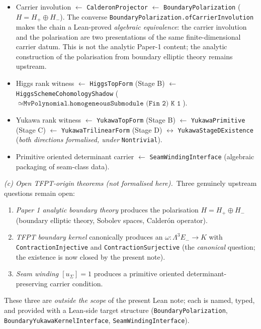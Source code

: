 \documentclass[11pt,a4paper]{article}
\begin{document}
\begin{tfptclaimcontract}
\begin{itemize}[leftmargin=1.6em, itemsep=0pt]
  \item Carrier involution $\leftarrow$
    \texttt{CalderonProjector} $\leftarrow$
    \texttt{BoundaryPolarization} ($H = H_+ \oplus H_-$).
    The converse \texttt{BoundaryPolarization.ofCarrierInvolution}
    makes the chain a Lean-proved \emph{algebraic
    equivalence}: the carrier involution and the polarisation
    are two presentations of the same finite-dimensional
    carrier datum. This is not the analytic Paper-1 content;
    the analytic construction of the polarisation from
    boundary elliptic theory remains upstream.
  \item Higgs rank witness $\leftarrow$
    \texttt{HiggsTopForm} (Stage B) $\leftarrow$
    \texttt{HiggsSchemeCohomologyShadow}
    ($\simeq \texttt{MvPolynomial.homogeneousSubmodule (Fin 2) K 1}$).
  \item Yukawa rank witness $\leftarrow$
    \texttt{YukawaTopForm} (Stage B) $\leftarrow$
    \texttt{YukawaPrimitive} (Stage C) $\leftarrow$
    \texttt{YukawaTrilinearForm} (Stage D) $\leftrightarrow$
    \texttt{YukawaStageDExistence} (\emph{both directions
    formalised, under} \texttt{Nontrivial}).
  \item Primitive oriented determinant carrier $\leftarrow$
    \texttt{SeamWindingInterface} (algebraic packaging of
    seam-class data).
\end{itemize}

\smallskip
\noindent
\emph{(c) Open TFPT-origin theorems (not formalised here).}\ Three
genuinely upstream questions remain open:

\begin{enumerate}[leftmargin=1.6em, itemsep=0pt, label=(\arabic*)]
  \item \emph{Paper 1 analytic boundary theory} produces the
    polarisation $H = H_+ \oplus H_-$ (boundary elliptic
    theory, Sobolev spaces, Calder\'on operator).
  \item \emph{TFPT boundary kernel} canonically produces an
    $\omega : \Lambda^3 E_- \to K$ with
    \texttt{ContractionInjective} and
    \texttt{ContractionSurjective} (the \emph{canonical}
    question; the existence is now closed by the present
    note).
  \item \emph{Seam winding $[u_\Sigma] = 1$} produces a
    primitive oriented determinant-preserving carrier
    condition.
\end{enumerate}

These three are \emph{outside the scope} of the present Lean
note; each is named, typed, and provided with a Lean-side
target structure
(\texttt{BoundaryPolarization},
\texttt{BoundaryYukawaKernelInterface},
\texttt{SeamWindingInterface}).


\end{tfptclaimcontract}
\end{document}
